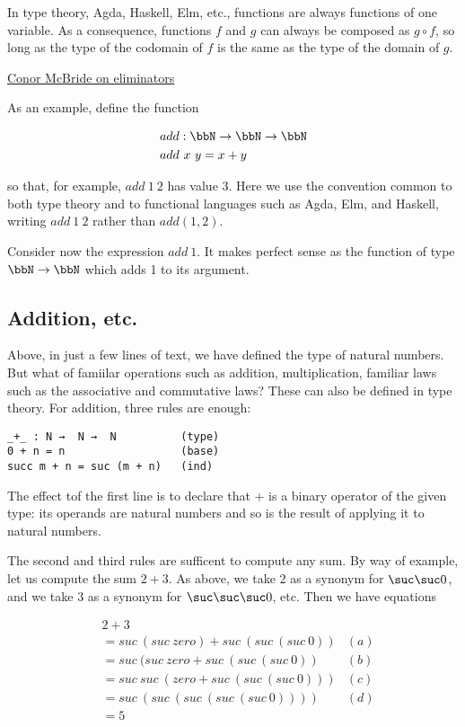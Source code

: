 In type theory, Agda, Haskell, Elm, etc., functions are always functions of one variable.  As a consequence, functions $f$ and $g$ can always be composed as $g\circ f$, so long as the type of the codomain of $f$ is the same as the type of the domain of $g$.

\href{https://www.quora.com/In-type-theory-what-is-an-eliminator-and-what-is-its-opposite}{Conor McBride on eliminators}

As an example, define the function 

\begin{align}
& add : \bbN \to \bbN \to \bbN \\
& add\ x\ y = x + y
\end{align}

so that, for example, $add\ 1\ 2$ has value 3. Here we use the convention common to both type theory and  to functional languages such as Agda, Elm, and Haskell, writing $add\ 1\ 2$ rather than $add(1,2)$. 


Consider now the expression $add\ 1$.  It makes perfect sense as the function of type $\bbN \to \bbN$ which adds 1 to its argument. 



\subsection{Addition, etc.}

Above, in just a few lines of text, we have defined  the type of natural numbers.  But what of famiilar operations such as addition, multiplication, familiar laws such as the associative and commutative laws?  These can also be defined in type theory.  For addition, three rules are enough:

\begin{verbatim}
_+_ : N →  N →  N          (type)
0 + n = n                  (base)
succ m + n = suc (m + n)   (ind) 
\end{verbatim}

The effect tof the first line is to declare that $+$ is a binary operator of the given type: its operands are natural numbers and so is the result of applying it to natural numbers.


The second and third rules are sufficent to compute any sum.
By way of example, let us compute the sum $2 + 3$.  As above, we take $2$ as a synonym for $\suc \suc 0$, and we take $3$ as a synonym for $\suc \suc \suc 0$, etc.
Then we have equations

\begin{align}
& 2 + 3 \\
 & = suc\ (suc\ zero) + suc\ (suc\ (suc\ 0)) & (a)\\
& = suc\ (suc\ zero + suc\ (suc\ (suc\ 0))  & (b)\\
& =  suc\ suc\ (zero + suc\ (suc\ (suc\ 0)))  &(c) \\
& =  suc\ (suc\ ( suc\ (suc\ (suc\ 0)) )) & (d) \\
& = 5  
\end{align}

